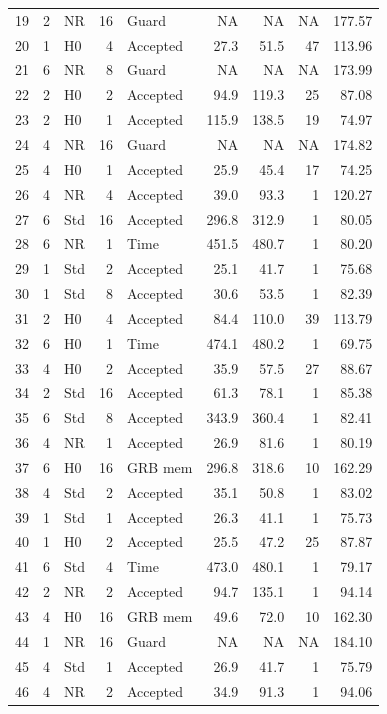 \documentclass[
  english,
  11pt,
  a4paper,
]{article}
\begin{document}
\begin{longtable}{@{}rrlrlrrrr@{}}
19 & 2 & NR & 16 & Guard & NA & NA & NA & 177.57\\
20 & 1 & H0 & 4 & Accepted & 27.3 & 51.5 & 47 & 113.96\\
21 & 6 & NR & 8 & Guard & NA & NA & NA & 173.99\\
22 & 2 & H0 & 2 & Accepted & 94.9 & 119.3 & 25 & 87.08\\
23 & 2 & H0 & 1 & Accepted & 115.9 & 138.5 & 19 & 74.97\\
24 & 4 & NR & 16 & Guard & NA & NA & NA & 174.82\\
25 & 4 & H0 & 1 & Accepted & 25.9 & 45.4 & 17 & 74.25\\
26 & 4 & NR & 4 & Accepted & 39.0 & 93.3 & 1 & 120.27\\
27 & 6 & Std & 16 & Accepted & 296.8 & 312.9 & 1 & 80.05\\
28 & 6 & NR & 1 & Time & 451.5 & 480.7 & 1 & 80.20\\
29 & 1 & Std & 2 & Accepted & 25.1 & 41.7 & 1 & 75.68\\
30 & 1 & Std & 8 & Accepted & 30.6 & 53.5 & 1 & 82.39\\
31 & 2 & H0 & 4 & Accepted & 84.4 & 110.0 & 39 & 113.79\\
32 & 6 & H0 & 1 & Time & 474.1 & 480.2 & 1 & 69.75\\
33 & 4 & H0 & 2 & Accepted & 35.9 & 57.5 & 27 & 88.67\\
34 & 2 & Std & 16 & Accepted & 61.3 & 78.1 & 1 & 85.38\\
35 & 6 & Std & 8 & Accepted & 343.9 & 360.4 & 1 & 82.41\\
36 & 4 & NR & 1 & Accepted & 26.9 & 81.6 & 1 & 80.19\\
37 & 6 & H0 & 16 & GRB mem & 296.8 & 318.6 & 10 & 162.29\\
38 & 4 & Std & 2 & Accepted & 35.1 & 50.8 & 1 & 83.02\\
39 & 1 & Std & 1 & Accepted & 26.3 & 41.1 & 1 & 75.73\\
40 & 1 & H0 & 2 & Accepted & 25.5 & 47.2 & 25 & 87.87\\
41 & 6 & Std & 4 & Time & 473.0 & 480.1 & 1 & 79.17\\
42 & 2 & NR & 2 & Accepted & 94.7 & 135.1 & 1 & 94.14\\
43 & 4 & H0 & 16 & GRB mem & 49.6 & 72.0 & 10 & 162.30\\
44 & 1 & NR & 16 & Guard & NA & NA & NA & 184.10\\
45 & 4 & Std & 1 & Accepted & 26.9 & 41.7 & 1 & 75.79\\
46 & 4 & NR & 2 & Accepted & 34.9 & 91.3 & 1 & 94.06\\

\end{longtable}
\end{document}
